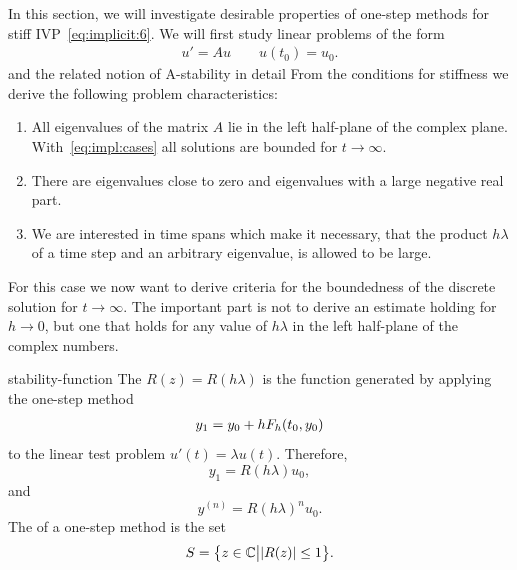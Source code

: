 \begin{intro}
  In this section, we will investigate desirable properties of
  one-step methods for stiff IVP~\eqref{eq:implicit:6}. We will first
  study linear problems of the form
\begin{gather}
  \label{eq:implicit:6}
  u'=Au \qquad u(t_0) = u_0.
\end{gather}
and the related notion of A-stability in
  detail From the conditions for stiffness we derive the following
  problem characteristics:
  \begin{enumerate}
  \item All eigenvalues of the matrix $A$ lie in the left half-plane
    of the complex plane. With~\eqref{eq:impl:cases} all solutions are
    bounded for $t\to\infty$.
  \item There are eigenvalues close to zero and eigenvalues with a
    large negative real part.
  \item We are interested in time spans which make it necessary, that
    the product $h\lambda$ of a time step and an arbitrary eigenvalue,
    is allowed to be large.
  \end{enumerate}
  For this case we now want to derive criteria for the boundedness of
  the discrete solution for $t\to\infty$. The important part is not to
  derive an estimate holding for $h\to 0$, but one that holds for any
  value of $h\lambda$ in the left half-plane of the complex numbers.
\end{intro}

\begin{Definition}{stability-function}
  The  $R(z) = R(h \lambda)$ is the
  function generated by applying the one-step method
  \begin{gather*}
    y_1 = y_0 + h F_h(t_0, y_0)
  \end{gather*}
  to the linear test problem $u'(t)=\lambda u(t)$. Therefore,
  \begin{equation}
    y_1 = R(h \lambda) u_0,
  \end{equation}
  and
  \begin{equation}
    y^{(n)} = R(h \lambda)^n u_0.
  \end{equation}
  The  of a one-step method is the set
  \begin{gather}
    S = \bigl\{ z \in \mathbb C \big| \lvert R(z)\rvert \le 1 \bigr\}.
  \end{gather}
\end{Definition}

